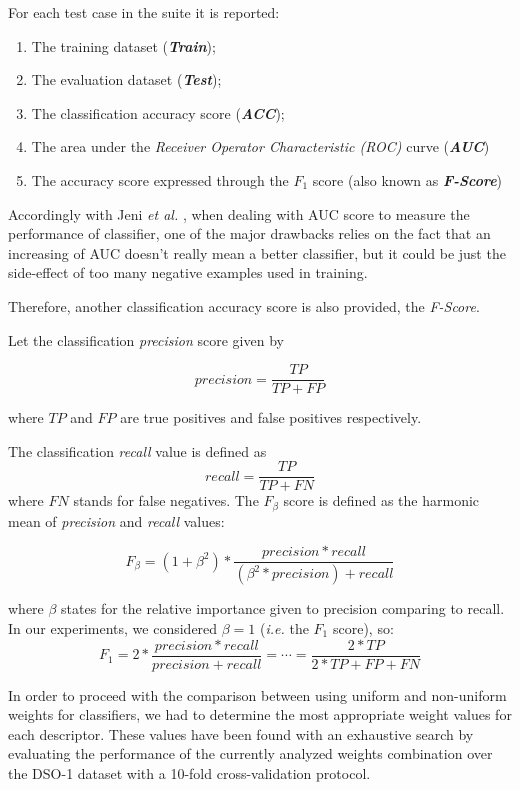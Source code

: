 For each test case in the suite it is reported:
\begin{enumerate}
\item The training dataset (\textbf{\emph{Train}});
\item The evaluation dataset (\textbf{\emph{Test}});
\item The classification accuracy score (\textbf{\emph{ACC}});
\item The area under the \emph{Receiver Operator Characteristic (ROC)} curve (\textbf{\emph{AUC}})
\item The accuracy score expressed through the $F_1$ score (also known as \textbf{\emph{F-Score}})
\end{enumerate}

Accordingly with Jeni \emph{et al.} \cite{jeni2013facing}, when dealing with AUC score to measure the performance of classifier, one of the major drawbacks relies on the fact that an increasing of AUC doesn't really mean a better classifier, but it could be just the side-effect of too many negative examples used in training.

Therefore, another classification accuracy score is also provided, the \emph{F-Score}. 

Let the classification \emph{precision} score given by

$$
precision = \frac{TP}{TP + FP}
$$

where $TP$ and $FP$ are true positives and false positives respectively.

The classification \emph{recall} value is defined as
$$
recall = \frac{TP}{TP + FN}
$$
where $FN$ stands for false negatives. The $F_{\beta}$ score is defined as the harmonic mean of \emph{precision} and \emph{recall} values:

\begin{equation}
F_{\beta} = (1 + \beta^2) * \frac{precision * recall}{(\beta^2 * precision) + recall}
\end{equation}

where $\beta$ states for the relative importance given to precision comparing to recall. In our experiments, we considered $\beta = 1$ (\emph{i.e.} the $F_1$ score), so:
\begin{equation}
F_{1} = 2 * \frac{precision * recall}{precision + recall}  = \cdots = \frac{2 * TP}{2 * TP + FP + FN}
\end{equation}

In order to proceed with the comparison between using uniform and non-uniform weights for classifiers, we had to determine the most appropriate weight values for each descriptor. These values have been found with an exhaustive search by evaluating the performance of the currently analyzed weights combination over the DSO-1 dataset with a 10-fold cross-validation protocol. 

